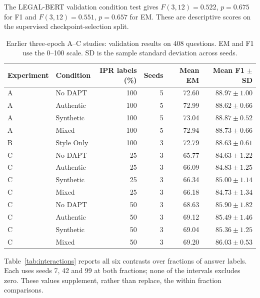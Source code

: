 \documentclass[pdflatex,sn-basic]{sn-jnl}
\begin{document}
The LEGAL-BERT validation condition test gives \(F(3,12)=0.522\),
\(p=0.675\) for F1 and \(F(3,12)=0.551\), \(p=0.657\) for EM.
These are descriptive scores on the supervised checkpoint-selection split.

\begin{table}[!htbp]
\caption{Earlier three-epoch A--C studies: validation results on 408 questions.
EM and F1 use the 0--100 scale. SD is the sample standard deviation across seeds.}
\label{tab:final_validation}
\centering
\small
\begin{tabular}{@{}llrrrr@{}}
\toprule
Experiment & Condition & IPR labels (\%) & Seeds & Mean EM & Mean F1 $\pm$ SD \\
\midrule
A & No DAPT & 100 & 5 & 72.60 & $88.97\pm1.00$ \\
A & Authentic & 100 & 5 & 72.99 & $88.62\pm0.66$ \\
A & Synthetic & 100 & 5 & 73.04 & $88.87\pm0.52$ \\
A & Mixed & 100 & 5 & 72.94 & $88.73\pm0.66$ \\
B & Style Only & 100 & 3 & 72.79 & $88.63\pm0.61$ \\
\midrule
C & No DAPT & 25 & 3 & 65.77 & $84.63\pm1.22$ \\
C & Authentic & 25 & 3 & 66.09 & $84.83\pm1.25$ \\
C & Synthetic & 25 & 3 & 66.34 & $85.00\pm1.14$ \\
C & Mixed & 25 & 3 & 66.18 & $84.73\pm1.34$ \\
C & No DAPT & 50 & 3 & 68.63 & $85.90\pm1.82$ \\
C & Authentic & 50 & 3 & 69.12 & $85.49\pm1.46$ \\
C & Synthetic & 50 & 3 & 69.04 & $85.36\pm1.25$ \\
C & Mixed & 50 & 3 & 69.20 & $86.03\pm0.53$ \\
\bottomrule
\end{tabular}
\end{table}

Table~\ref{tab:interactions} reports all six contrasts over fractions of answer labels.
Each uses seeds 7, 42 and 99 at both fractions; none of the intervals
excludes zero. These values supplement, rather than replace, the
within fraction comparisons.
\end{document}
